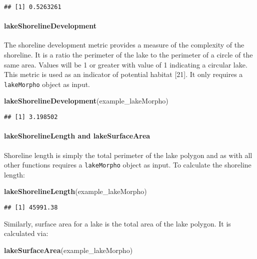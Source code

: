 \documentclass[11pt,]{article}
\newenvironment{Shaded}{\begin{snugshade}}{\end{snugshade}}
\newcommand{\KeywordTok}[1]{\textcolor[rgb]{0.13,0.29,0.53}{\textbf{{#1}}}}
\newcommand{\NormalTok}[1]{{#1}}
\begin{document}
\begin{verbatim}
## [1] 0.5263261
\end{verbatim}

\paragraph{lakeShorelineDevelopment}\label{lakeshorelinedevelopment}

The shoreline development metric provides a measure of the complexity of
the shoreline. It is a ratio the perimeter of the lake to the perimeter
of a circle of the same area. Values will be 1 or greater with value of
1 indicating a circular lake. This metric is used as an indicator of
potential habitat {[}21{]}. It only requires a \texttt{lakeMorpho}
object as input.

\begin{Shaded}
\begin{Highlighting}[]
\KeywordTok{lakeShorelineDevelopment}\NormalTok{(example_lakeMorpho)}
\end{Highlighting}
\end{Shaded}

\begin{verbatim}
## [1] 3.198502
\end{verbatim}

\paragraph{lakeShorelineLength and
lakeSurfaceArea}\label{lakeshorelinelength-and-lakesurfacearea}

Shoreline length is simply the total perimeter of the lake polygon and
as with all other functions requires a \texttt{lakeMorpho} object as
input. To calculate the shoreline length:

\begin{Shaded}
\begin{Highlighting}[]
\KeywordTok{lakeShorelineLength}\NormalTok{(example_lakeMorpho)}
\end{Highlighting}
\end{Shaded}

\begin{verbatim}
## [1] 45991.38
\end{verbatim}

Similarly, surface area for a lake is the total area of the lake
polygon. It is calculated via:

\begin{Shaded}
\begin{Highlighting}[]
\KeywordTok{lakeSurfaceArea}\NormalTok{(example_lakeMorpho)}
\end{Highlighting}
\end{Shaded}
\end{document}
